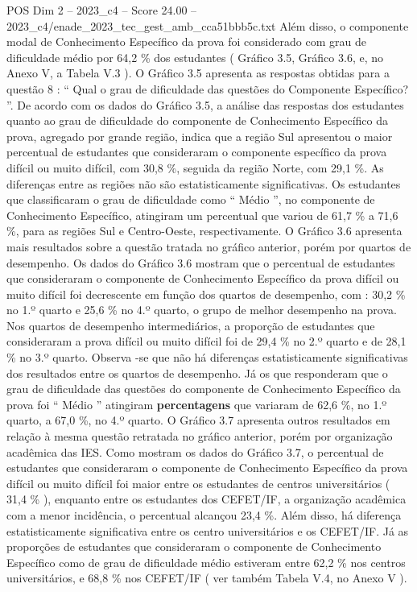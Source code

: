 \begin{textsample}{POS Dim 2 – 2023\_c4 – Score 24.00 – 2023\_c4/enade\_2023\_tec\_gest\_amb\_cca51bbb5c.txt}
Além disso, o componente modal de Conhecimento Específico da prova foi considerado com grau de dificuldade médio por 64,2 \% dos estudantes ( Gráfico 3.5, Gráfico 3.6, e, no Anexo V, a Tabela V.3 ).
O Gráfico 3.5 apresenta as respostas obtidas para a questão 8 : “ Qual o grau de dificuldade das questões do Componente Específico? ”.
De acordo com os dados do Gráfico 3.5, a análise das respostas dos estudantes quanto ao grau de dificuldade do componente de Conhecimento Específico da prova, agregado por grande região, indica que a região Sul apresentou o maior percentual de estudantes que consideraram o componente específico da prova difícil ou muito difícil, com 30,8 \%, seguida da região Norte, com 29,1 \%.
As diferenças entre as regiões não são estatisticamente significativas.
Os estudantes que classificaram o grau de dificuldade como “ Médio ”, no componente de Conhecimento Específico, atingiram um percentual que variou de 61,7 \% a 71,6 \%, para as regiões Sul e Centro-Oeste, respectivamente.
O Gráfico 3.6 apresenta mais resultados sobre a questão tratada no gráfico anterior, porém por quartos de desempenho.
Os dados do Gráfico 3.6 mostram que o percentual de estudantes que consideraram o componente de Conhecimento Específico da prova difícil ou muito difícil foi decrescente em função dos quartos de desempenho, com : 30,2 \% no 1.º quarto e 25,6 \% no 4.º quarto, o grupo de melhor desempenho na prova.
Nos quartos de desempenho intermediários, a proporção de estudantes que consideraram a prova difícil ou muito difícil foi de 29,4 \% no 2.º quarto e de 28,1 \% no 3.º quarto.
Observa -se que não há diferenças estatisticamente significativas dos resultados entre os quartos de desempenho.
Já os que responderam que o grau de dificuldade das questões do componente de Conhecimento Específico da prova foi “ Médio ” atingiram \textbf{percentagens} que variaram de 62,6 \%, no 1.º quarto, a 67,0 \%, no 4.º quarto.
O Gráfico 3.7 apresenta outros resultados em relação à mesma questão retratada no gráfico anterior, porém por organização acadêmica das IES.
Como mostram os dados do Gráfico 3.7, o percentual de estudantes que consideraram o componente de Conhecimento Específico da prova difícil ou muito difícil foi maior entre os estudantes de centros universitários ( 31,4 \% ), enquanto entre os estudantes dos CEFET/IF, a organização acadêmica com a menor incidência, o percentual alcançou 23,4 \%.
Além disso, há diferença estatisticamente significativa entre os centro universitários e os CEFET/IF.
Já as proporções de estudantes que consideraram o componente de Conhecimento Específico como de grau de dificuldade médio estiveram entre 62,2 \% nos centros universitários, e 68,8 \% nos CEFET/IF ( ver também Tabela V.4, no Anexo V ).

\end{textsample}
